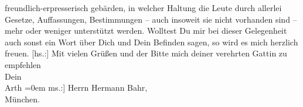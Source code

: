 \begin{ledgroupsized}[t]{13cm}
               freundlich-erpresserisch gebärden, in welcher Haltung die Leute durch allerlei
               Gesetze, Auffassungen, Bestimmungen – auch insoweit sie nicht vorhanden sind – mehr
               oder weniger unterstützt werden.\pend
           \pstart
           Wolltest Du mir bei dieser Gelegenheit auch sonst ein Wort über Dich und Dein
               Befinden sagen, so wird es mich herzlich freuen.\pend
           \pstart
           {[}hs.:{]} Mit vielen Grüßen und der Bitte mich deiner verehrten Gattin zu empfehlen{\\[\baselineskip]}Dein{\\[\baselineskip]}\spacefill\mbox{Arth}\pend
           \leftskip=0em{}\pstart
           \noindent{}{[}ms.:{]}  Herrn Hermann Bahr,{\\}München.\pend
           
         
         \endnumbering{}\end{ledgroupsized}  \newcommand{\dateiname}{L02546}\newcommand{\titel}{Arthur Schnitzler an Hermann Bahr, 5. 9. 1931}\newcommand{\editorInnen}{ Kurt Ifkovits,  Martin Anton Müller}
      